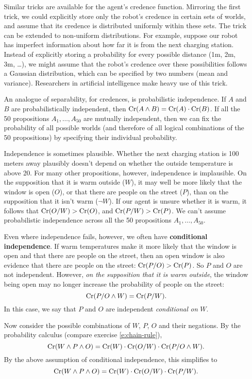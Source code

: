Similar tricks are available for the agent's credence function. Mirroring the
first trick, we could explicitly store only the robot's credence in certain sets
of worlds, and assume that its credence is distributed uniformly within these
sets. The trick can be extended to non-uniform distributions. For example,
suppose our robot has imperfect information about how far it is from the next
charging station. Instead of explicitly storing a probability for every possible
distance (1m, 2m, 3m, \ldots), we might assume that the robot's credence over
these possibilities follows a Gaussian distribution, which can be specified by
two numbers (mean and variance). Researchers in artificial intelligence make
heavy use of this trick.

An analogue of separability, for credences, is probabilistic independence. If
$A$ and $B$ are probabilistically independent, then
$\text{Cr}(A\land B) = \text{Cr}(A) \cdot \text{Cr}(B)$. If all the 50 propositions
$A_1,\ldots,A_{50}$ are mutually independent, then we can fix the probability of
all possible worlds (and therefore of all logical combinations of the 50
propositions) by specifying their individual probability.

Independence is sometimes plausible. Whether the next charging station is 100
meters away plausibly doesn't depend on whether the outside temperature is above
20\celsius. For many other propositions, however, independence is implausible.
On the supposition that it is warm outside ($W$), it may well be more likely
that the window is open ($O$), or that there are people on the street ($P$),
than on the supposition that it isn't warm ($\neg W$). If our agent is unsure
whether it is warm, it follows that $\text{Cr}(O/W) > \text{Cr}(O)$, and
$\text{Cr}(P/W) > \text{Cr}(P)$. We can't assume probabilistic independence across all the
50 propositions $A_1,\ldots,A_{50}$.

Even where independence fails, however, we often have \textbf{conditional
  independence}. If warm temperatures make it more likely that the window is
open and that there are people on the street, then an open window is also
evidence that there are people on the street: $\text{Cr}(P/O) > \text{Cr}(P)$. So $P$ and $O$
are not independent. However, \emph{on the supposition that it is warm outside},
the window being open may no longer increase the probability of people on the
street:
\[
  \text{Cr}(P/O \land W) = \text{Cr}(P/ W).
\]
In this case, we say that $P$ and $O$ are independent \emph{conditional on} $W$.

Now consider the possible combinations of $W$, $P$, $O$ and their negations. By
the probability calculus (compare exercise \ref{e:chain-rule}),
\[
  \text{Cr}(W \land P \land O) = \text{Cr}(W) \cdot \text{Cr}(O/W) \cdot \text{Cr}(P/O \land W).
\]
By the above assumption of conditional independence, this simplifies to
\[
  \text{Cr}(W \land P \land O) = \text{Cr}(W) \cdot \text{Cr}(O/W) \cdot \text{Cr}(P/W).
\]

